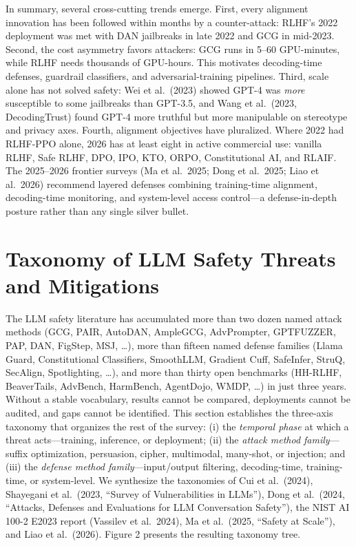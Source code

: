 \documentclass{article}
\begin{document}
In summary, several cross-cutting trends emerge. First, every alignment innovation has been followed within months by a counter-attack: RLHF's 2022 deployment was met with DAN jailbreaks in late 2022 and GCG in mid-2023. Second, the cost asymmetry favors attackers: GCG runs in 5--60 GPU-minutes, while RLHF needs thousands of GPU-hours. This motivates decoding-time defenses, guardrail classifiers, and adversarial-training pipelines. Third, scale alone has not solved safety: Wei et al.~(2023) showed GPT-4 was \emph{more} susceptible to some jailbreaks than GPT-3.5, and Wang et al.~(2023, DecodingTrust) found GPT-4 more truthful but more manipulable on stereotype and privacy axes. Fourth, alignment objectives have pluralized. Where 2022 had RLHF-PPO alone, 2026 has at least eight in active commercial use: vanilla RLHF, Safe RLHF, DPO, IPO, KTO, ORPO, Constitutional AI, and RLAIF. The 2025--2026 frontier surveys (Ma et al.~2025; Dong et al.~2025; Liao et al.~2026) recommend layered defenses combining training-time alignment, decoding-time monitoring, and system-level access control---a defense-in-depth posture rather than any single silver bullet.

\section{Taxonomy of LLM Safety Threats and Mitigations}\label{taxonomy-of-llm-safety-threats-and-mitigations}

The LLM safety literature has accumulated more than two dozen named attack methods (GCG, PAIR, AutoDAN, AmpleGCG, AdvPrompter, GPTFUZZER, PAP, DAN, FigStep, MSJ, \ldots), more than fifteen named defense families (Llama Guard, Constitutional Classifiers, SmoothLLM, Gradient Cuff, SafeInfer, StruQ, SecAlign, Spotlighting, \ldots), and more than thirty open benchmarks (HH-RLHF, BeaverTails, AdvBench, HarmBench, AgentDojo, WMDP, \ldots) in just three years. Without a stable vocabulary, results cannot be compared, deployments cannot be audited, and gaps cannot be identified. This section establishes the three-axis taxonomy that organizes the rest of the survey: (i) the \emph{temporal phase} at which a threat acts---training, inference, or deployment; (ii) the \emph{attack method family}---suffix optimization, persuasion, cipher, multimodal, many-shot, or injection; and (iii) the \emph{defense method family}---input/output filtering, decoding-time, training-time, or system-level. We synthesize the taxonomies of Cui et al.~(2024), Shayegani et al.~(2023, ``Survey of Vulnerabilities in LLMs''), Dong et al.~(2024, ``Attacks, Defenses and Evaluations for LLM Conversation Safety''), the NIST AI 100-2 E2023 report (Vassilev et al.~2024), Ma et al.~(2025, ``Safety at Scale''), and Liao et al.~(2026). Figure 2 presents the resulting taxonomy tree.
\end{document}
